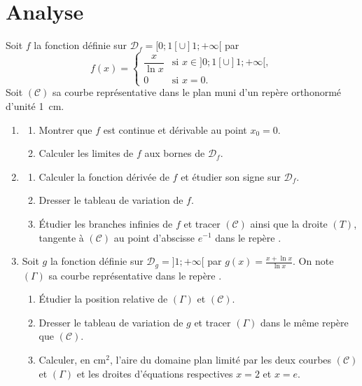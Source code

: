 \section{Analyse}
\begin{exo}
Soit $f$ la fonction d\'efinie sur
$\mathcal{D}_f = [0 ; 1[ \cup ]1 ; +\infty[$ par
\[
  f(x)=
  \begin{cases}
    \dfrac{x}{\ln x} & \text{si } x \in ]0 ; 1[ \cup ]1 ; +\infty[, \\
    0                 & \text{si } x=0.
  \end{cases}
\]
Soit $(\mathscr{C})$ sa courbe repr\'esentative dans le plan muni d'un rep\`ere
orthonorm\'e \Oij{} d'unit\'e 1~cm.
\begin{enumerate}
\item \begin{enumerate}
      \item Montrer que $f$ est continue et d\'erivable au point $x_0 = 0$.
      \item Calculer les limites de $f$ aux bornes de $\mathcal{D}_f$.
      \end{enumerate}
\item \begin{enumerate}
      \item Calculer la fonction d\'eriv\'ee de $f$ et \'etudier son signe sur $\mathcal{D}_f$.
	      \item Dresser le tableau de variation de $f$.
	      \item \'Etudier les branches infinies de $f$ et tracer $(\mathscr{C})$ ainsi que 
            la droite $(T)$, tangente \`a $(\mathscr{C})$ au point d'abscisse $e^{-1}$ dans le rep\`ere \Oij. 
      \end{enumerate}
\item Soit $g$ la fonction d\'efinie sur $\mathcal{D}_g = ]1 ; +\infty[$ par
      $g(x) = \frac{x + \ln x}{\ln x}$.
      On note $(\Gamma)$ sa courbe repr\'esentative dans le rep\`ere \Oij.
      \begin{enumerate}
      \item \'Etudier la position relative de $(\Gamma)$ et $(\mathscr{C})$.
      \item Dresser le tableau de variation de $g$ et tracer $(\Gamma)$ dans le m\^eme rep\`ere que $(\mathscr{C})$.
      \item Calculer, en $\text{cm}^2$, l'aire du domaine plan limit\'e par les deux courbes $(\mathscr{C})$ et $(\Gamma)$ 
            et les droites d'\'equations respectives $x = 2$ et $x = e$.
      \end{enumerate}
\end{enumerate}
\end{exo}
